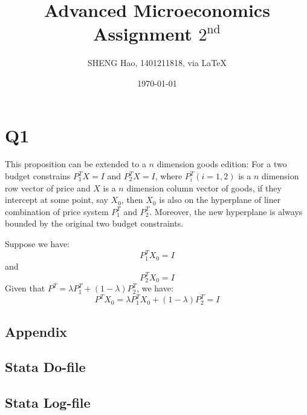 \documentclass{article}
\begin{document}
\title{Advanced Microeconomics\\Assignment $2^{\text{nd}}$}
\author{{\normalsize SHENG Hao, 1401211818, via \LaTeX}}
\date{\today}

\maketitle

\def \Pr{{\rm Pr}}
\baselineskip 0.6cm
\section{Q1}

This proposition can be extended to a $n$ dimension goods edition:
For a two budget constrains $P^T_1X = I$ and $P^T_2X = I$, where $P^T_i(i=1,2)$ is a $n$ dimension row vector of price and $X$ is a $n$ dimension column vector of goods, if they intercept at some point, say $X_0$, then $X_0$ is also on the hyperplane of liner combination of price system $P^T_1$ and $P^T_2$. Moreover, the new hyperplane is always bounded by the original two budget constraints.

Suppose we have:
\begin{equation}
P^T_1X_0 = I
\end{equation}
and
\begin{equation}
P^T_2X_0 = I
\end{equation}
Given that $P^T = \lambda P^T_1 + (1-\lambda) P^T_2$, we have:
\begin{equation}
P^TX_0 = \lambda P^T_1 X_0 + (1-\lambda) P^T_2 = I
\end{equation}

\newpage
\begin{appendix}
\section*{Appendix}
\subsection{Stata Do-file}
\subsection{Stata Log-file}
\end{appendix}
\end{document}
